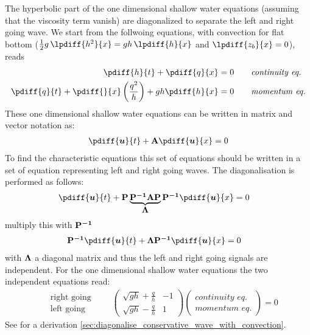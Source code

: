 The hyperbolic part of the one dimensional shallow water equations (assuming that the viscosity term vanish) are diagonalized to separate the left and right going wave.
We start from the follwoing equations, with convection
for flat bottom ($\half g\, \lpdiff{h^2}{x} = gh\, \lpdiff{h}{x}$ and $\lpdiff{z_b}{x} = 0$), reads
%
\begin{align}
    \pdiff{h}{t}  + \pdiff{q}{x} & = 0 \qquad \textit{continuity eq.} \label{eq:continuity_equation}\\
    \pdiff{q}{t}  + \pdiff{}{x} \left( \frac{q^2}{h} \right) + g h \pdiff{h}{x} & = 0 \qquad \textit{momentum eq.}
    \label{eq:momentum_equation}
\end{align}
These one dimensional shallow water equations can be written in matrix and vector notation as:
\begin{align}
    \pdiff{\vec{u}}{t} + \mat{A} \pdiff{\vec{u}}{x} = 0
\end{align}
To find the characteristic equations this set of equations should be written in a set of equation representing left and right going waves.
The diagonalisation is performed as follows:
\begin{align}
    &\pdiff{\vec{u}}{t} + \mat{P}\underbrace{\mat{P^{-1}}\mat{A}\mat{P}}_{\mat{\Lambda}}\mat{P^{-1}} \pdiff{\vec{u}}{x} = 0
\end{align}
multiply this with $\mbox{\boldmath ${\rm P^{-1}}$}$
\begin{align}
    &\mat{P^{-1}}\pdiff{\vec{u}}{t} + \mat{\Lambda}\mat{P^{-1}} \pdiff{\vec{u}}{x} = 0
\end{align}
with $\mbox{\boldmath ${\rm \Lambda}$}$ a diagonal matrix and thus the left and right going signals are independent.
For the one dimensional shallow water equations the two independent equations read:
\begin{align}
    \begin{matrix}
        \quad \text{right going} \\
        \quad \text{left going}
    \end{matrix}
    \qquad
    \begin{pmatrix}
        \sqrt{gh} + \frac{q}{h}  &  -1 \\
        \sqrt{gh} - \frac{q}{h}  &  1
    \end{pmatrix}
    \begin{pmatrix} \textit{continuity eq.} \\ \textit{momentum eq.} \end{pmatrix}    = 0
    \label{eq:left_right_going_equations}
\end{align}
See for a derivation \autoref{sec:diagonalise_conservative_wave_with_convection}.

